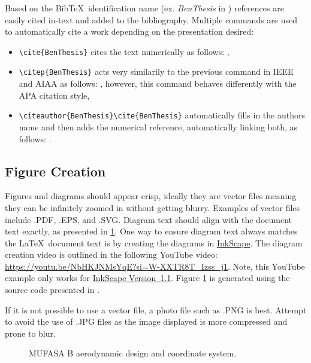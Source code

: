 Based on the Bib\TeX\ identification name (ex. \textit{BenThesis} in ) references are easily cited in-text and added to the bibliography. Multiple commands are used to automatically cite a work depending on the presentation desired:
\begin{itemize}
	\item \verb*|\cite{BenThesis}| cites the text numerically as follows: \cite{BenThesis},
	\item \verb*|\citep{BenThesis}| acts very similarily to the previous command in IEEE and AIAA as follows: \citep{BenThesis}, however, this command behaves differently with the APA citation style, 
	\item \verb*|\citeauthor{BenThesis}\cite{BenThesis}| automatically fills in the authors name and then adds the numerical reference, automatically linking both, as follows: \citeauthor {BenThesis} \cite{BenThesis}.
\end{itemize}


\subsection{Figure Creation} \label{sec:figureCreation}

Figures and diagrams should appear crisp, ideally they are vector files meaning they can be infinitely zoomed in without getting blurry. 
Examples of vector files include .PDF, .EPS, and .SVG. 
Diagram text should align with the document text exactly, as presented in \cref{fig:mufasaB2}. One way to ensure diagram text always matches the \LaTeX\ document text is by creating the diagrams in \href{https://inkscape.org/}{InkScape}. 
The diagram creation video is outlined in the following YouTube video: \url{https://youtu.be/NbHKJNMsYqE?si=W-XXTR8T_Izss_j1}. 
Note, this YouTube example only works for \href{https://inkscape.org/release/inkscape-1.1/?latest=1%29}{InkScape Version~1.1}. 
Figure \ref{fig:mufasaB2} is generated using the source code presented in . 

If it is not possible to use a vector file, a photo file such as .PNG is best. 
Attempt to avoid the use of .JPG files as the image displayed is more compressed and prone to blur. 


\begin{figure}[hbt!]
	\centering
	\captionsetup{width=0.7\textwidth}
	\def\svgwidth{0.7\textwidth}
	
	\caption{MUFASA B aerodynamic design and coordinate system.}
	\label{fig:mufasaB2}
	\hfill
\end{figure}



